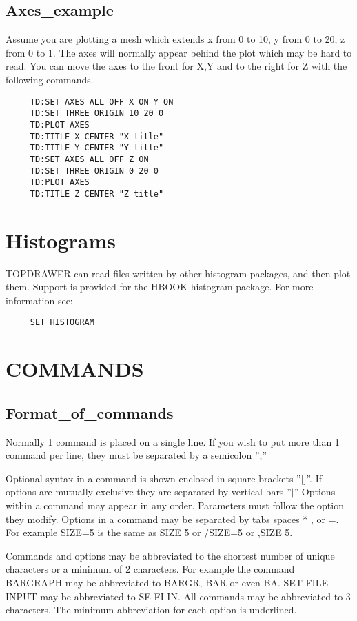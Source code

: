 \subsection{Axes\_example}
Assume  you are plotting a mesh which extends x from 0 to 10, y from 0 to
20, z from 0 to 1.  The axes will normally appear behind the  plot  which
may  be  hard to read.  You can move the axes to the front for X,Y and to
the right for Z with the following commands.  
\begin{verbatim}
     TD:SET AXES ALL OFF X ON Y ON 
     TD:SET THREE ORIGIN 10 20 0 
     TD:PLOT AXES 
     TD:TITLE X CENTER "X title" 
     TD:TITLE Y CENTER "Y title" 
     TD:SET AXES ALL OFF Z ON 
     TD:SET THREE ORIGIN 0 20 0 
     TD:PLOT AXES 
     TD:TITLE Z CENTER "Z title" 
\end{verbatim}
\section{Histograms}
TOPDRAWER can read files written by other histogram packages, and then plot
them.  Support is provided for  the  HBOOK  histogram  package.   For  more
information see:  
\begin{verbatim}
     SET HISTOGRAM 
\end{verbatim}
\section{COMMANDS}
\subsection{Format\_of\_commands}
Normally  1  command is placed on a single line.  If you wish to put more
than 1 command per line, they must be separated by a semicolon '';'' 

Optional  syntax  in a command is shown enclosed in square brackets ''[]''.
If options are mutually exclusive they are separated by vertical bars ''$|$''
Options within a command may appear in any order.  Parameters must follow
the option they modify.  Options in a command may be  separated  by  tabs
spaces  * , or =.  For example SIZE=5 is the same as SIZE 5 or /SIZE=5 or
,SIZE 5.  

Commands  and options may be abbreviated to the shortest number of unique
characters or a  minimum  of  2  characters.   For  example  the  command
BARGRAPH may be abbreviated to BARGR, BAR or even BA.  SET FILE INPUT may
be abbreviated to SE FI  IN.   All  commands  may  be  abbreviated  to  3
characters.  The minimum abbreviation for each option is underlined.  

